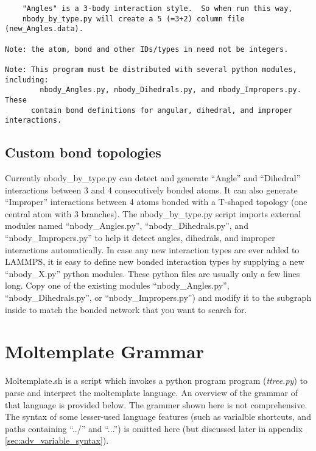 \documentclass[11pt]{article}
\begin{document}
\begin{verbatim}
    "Angles" is a 3-body interaction style.  So when run this way, 
    nbody_by_type.py will create a 5 (=3+2) column file (new_Angles.data).

Note: the atom, bond and other IDs/types in need not be integers.

Note: This program must be distributed with several python modules, including:
        nbody_Angles.py, nbody_Dihedrals.py, and nbody_Impropers.py.  These
      contain bond definitions for angular, dihedral, and improper interactions.
\end{verbatim}

\subsection{Custom bond topologies}
\label{sec:nbody_by_type_custom}
  Currently nbody\_by\_type.py can detect and generate ``Angle'' 
and ``Dihedral'' interactions between 3 and 4 consecutively bonded atoms. 
It can also generate ``Improper'' interactions between 4 atoms bonded 
with a T-shaped topology (one central atom with 3 branches). 
The nbody\_by\_type.py script imports external modules named 
``nbody\_Angles.py'', ``nbody\_Dihedrals.py'', and ``nbody\_Impropers.py'' 
to help it detect angles, dihedrals, and improper interactions automatically.
In case any new interaction types are ever added to LAMMPS, 
it is easy to define new bonded interaction types by supplying 
a new ``nbody\_X.py'' python modules. 
These python files are usually only a few lines long. 
Copy one of the existing modules 
``nbody\_Angles.py'', ``nbody\_Dihedrals.py'', or ``nbody\_Impropers.py'') 
and modify it to the subgraph inside to match the bonded network 
that you want to search for.






\section{Moltemplate Grammar}
\label{sec:grammar}

Moltemplate.sh is a script which invokes a python program program (\textit{ttree.py}) to parse and interpret the moltemplate language.  An overview of the grammar of that language is provided below.  The grammer shown here is not comprehensive.  The syntax of some lesser-used language features (such as varialble shortcuts, and paths containing ``../'' and ``...'') is omitted here
(but discussed later in appendix \ref{sec:adv_variable_syntax}).
\end{document}
